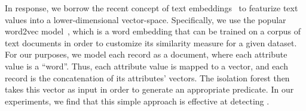 In response, we borrow the recent concept of text embeddings~\cite{} to featurize text values into a lower-dimensional vector-space.  Specifically, we use the popular \textsf{word2vec} model~\cite{mikolov2013distributed}, which is a word embedding that can be trained on a corpus of text documents in order to customize its similarity measure for a given dataset.  For our purposes, we model each record as a document, where each attribute value is a ``word''.  Thus, each attribute value is mapped to a vector, and each record is the concatenation of its attributes' vectors.  The isolation forest then takes this vector as input in order to generate an appropriate predicate.  In our experiments, we find that this simple approach is effective at detecting  .


 













\iffalse
